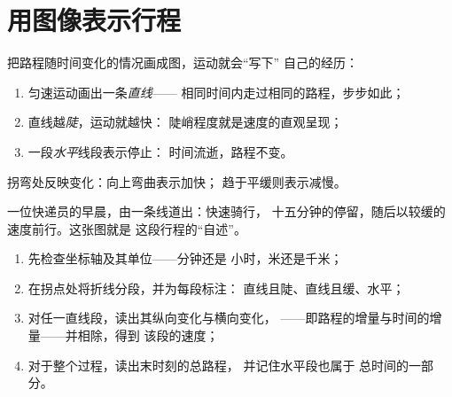 \section{用图像表示行程}

\begin{proposition}[图像规律]\label{prop:g7:motion-average-speed:graphs}
把路程随时间变化的情况画成图，运动就会“写下”
自己的经历：
\begin{enumerate}
  \item 匀速运动画出一条\emph{直线}——
        相同时间内走过相同的路程，步步如此；
  \item 直线越\emph{陡}，运动就越快：
        陡峭程度就是速度的直观呈现；
  \item 一段\emph{水平}线段表示停止：
        时间流逝，路程不变。
\end{enumerate}
拐弯处反映变化：向上弯曲表示加快；
趋于平缓则表示减慢。
\end{proposition}

\begin{omfigure}

{\small 一位快递员的早晨，由一条线道出：快速骑行，
十五分钟的停留，随后以较缓的速度前行。这张图就是
这段行程的“自述”。}
\end{omfigure}

\begin{method}\label{met:g7:motion-average-speed:read}
\begin{enumerate}
  \item 先检查坐标轴及其单位——分钟还是
        小时，米还是千米；
  \item 在拐点处将折线分段，并为每段标注：
        直线且陡、直线且缓、水平；
  \item 对任一直线段，读出其纵向变化与横向变化，
        ——即路程的增量与时间的增量——并相除，得到
        该段的速度；
  \item 对于整个过程，读出末时刻的总路程，
        并记住水平段也属于
        总时间的一部分。
\end{enumerate}
\end{method}

